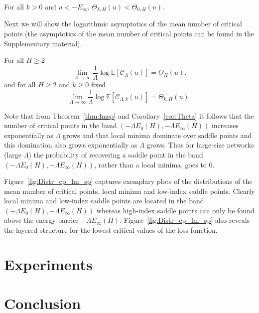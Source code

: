 \documentclass[twoside]{article}
\begin{document}
\begin{corollary}
For all $k > 0$ and $u < -E_{\infty}$, $\Theta_{k,H}(u) < \Theta_{0,H}(u)$.
\label{cor:Theta}
\end{corollary}

Next we will show the logarithmic asymptotics of the mean number of critical points (the asymptotics of the mean number of critical points can be found in the Supplementary material). 
\begin{theorem}
For all $H \geq 2$
\[\lim_{\Lambda \rightarrow \infty}\frac{1}{\Lambda}\log\mathbb{E}[\mathcal{C}_{\Lambda}(u)] = \Theta_{H}(u).
\]
and for all $H \geq 2$ and $k \geq 0$ fixed
\[\lim_{\Lambda \rightarrow \infty}\frac{1}{\Lambda}\log\mathbb{E}[\mathcal{C}_{\Lambda,k}(u)] = \Theta_{k,H}(u).
\]
\label{thm:lmsp}
\end{theorem}
Note that from Theorem~\ref{thm:lmsp} and Corollary~\ref{cor:Theta} it follows that the number of critical points in the band $\left(-\Lambda E_0(H),-\Lambda E_{\infty}(H)\right)$ increases exponentially as $\Lambda$ grows and that local minima dominate over saddle points and this domination also grows exponentially as $\Lambda$ grows. Thus for large-size networks (large $\Lambda$) the probability of recovering a saddle point in the band $\left(-\Lambda E_0(H),-\Lambda E_{\infty}(H)\right)$, rather than a local minima, goes to $0$.

Figure~\ref{fig:Distr_cp_lm_sp} captures exemplary plots of the distributions of the mean number of critical points, local minima and low-index saddle points. Clearly local minima and low-index saddle points are located in the band $\left(-\Lambda E_0(H),-\Lambda E_{\infty}(H)\right)$ whereas high-index saddle points can only be found above the energy barrier $-\Lambda E_{\infty}(H)$. Figure~\ref{fig:Distr_cp_lm_sp} also reveals the layered structure for the lowest critical values of the loss function. 

\section{Experiments}
\label{sec:Experiments}


\section{Conclusion}
\label{sec:ConandFutWork}
\end{document}
